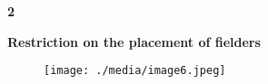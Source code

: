 \documentclass[12pt]{article}
\begin{document}
\vspace{\baselineskip}

\vspace{\baselineskip}

\vspace{\baselineskip}
{\fontsize{16pt}{19.2pt}\selectfont \textbf{2 \tabto{0.29in} }{\fontsize{15pt}{18.0pt}\selectfont \textbf{Restriction on the placement of fielders}\par}\par}\par




\begin{figure}[H]
\advance\leftskip 0.0in		\texttt{[image: ./media/image6.jpeg]}
\end{figure}



\par


\vspace{\baselineskip}

\vspace{\baselineskip}

\vspace{\baselineskip}

\vspace{\baselineskip}

\vspace{\baselineskip}

\vspace{\baselineskip}

\vspace{\baselineskip}

\vspace{\baselineskip}

\vspace{\baselineskip}

\vspace{\baselineskip}

\vspace{\baselineskip}

\vspace{\baselineskip}

\vspace{\baselineskip}

\vspace{\baselineskip}
\end{document}
